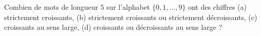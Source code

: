 Combien de mots de longueur $5$ sur l'alphabet $\{0, 1, \ldots, 9\}$ ont des chiffres (a) strictement croissants, (b) strictement croissants ou strictement décroissants, (c) croissants au sens large, (d) croissants ou décroissants au sens large ?
